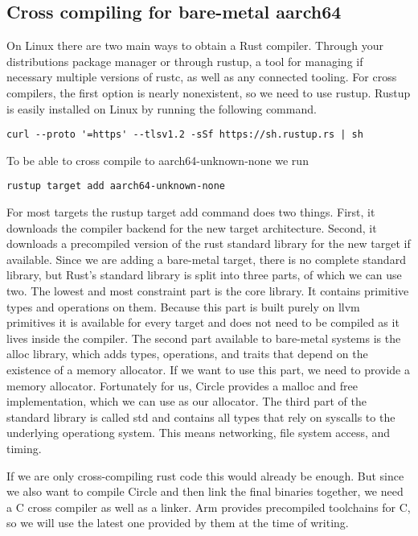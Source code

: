 \subsection{Cross compiling for bare-metal aarch64}
\label{sec:concept_and_implementation:bare-metal:cross}

On Linux there are two main ways to obtain a Rust compiler.
Through your distributions package manager or through rustup,
a tool for managing if necessary multiple versions of rustc, as well as any connected tooling.
For cross compilers, the first option is nearly nonexistent, so we need to use rustup.
Rustup is easily installed on Linux by running the following command.
\begin{verbatim}
curl --proto '=https' --tlsv1.2 -sSf https://sh.rustup.rs | sh
\end{verbatim}
To be able to cross compile to aarch64-unknown-none we run
\begin{verbatim}
rustup target add aarch64-unknown-none
\end{verbatim}
For most targets the rustup target add command does two things.
First, it downloads the compiler backend for the new target architecture.
Second, it downloads a precompiled version of the rust standard library for the new target if available.
Since we are adding a bare-metal target, there is no complete standard library, but Rust's standard library is split into three parts, of which we can use two.
The lowest and most constraint part is the core library.
It contains primitive types and operations on them.
Because this part is built purely on llvm primitives it is available for every target and does not need to be compiled as it lives inside the compiler.
The second part available to bare-metal systems is the alloc library, which adds types, operations, and traits that depend on the existence of a memory allocator.
If we want to use this part, we need to provide a memory allocator.
Fortunately for us, Circle provides a malloc and free implementation, which we can use as our allocator.
The third part of the standard library is called std and contains all types that rely on syscalls to the underlying operationg system.
This means networking, file system access, and timing.

If we are only cross-compiling rust code this would already be enough.
But since we also want to compile Circle and then link the final binaries together, we need a C cross compiler as well as a linker.
Arm provides precompiled toolchains for C, so we will use the latest one provided by them at the time of writing.

